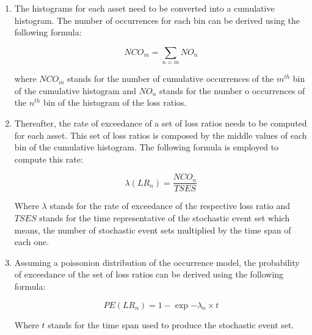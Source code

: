 \begin{enumerate}
\item The histograms for each asset need to be converted into a cumulative histogram. The number of occurrences for each bin can be derived using the following formula:

\begin{equation}
NCO_m = \sum_{n=m} NO_n
\end{equation}

where $NCO_m$ stands for the number of cumulative occurrences of the $m^{th}$ bin of the cumulative histogram and $NO_n$ stands for the number o occurrences of the $n^{th}$ bin of the histogram of the loss ratios.

\item Thereafter, the rate of exceedance of a set of loss ratios needs to be computed for each asset. This set of loss ratios is composed by the middle values of each bin of the cumulative histogram. The following formula is employed to compute this rate:

\begin{equation}
\lambda(LR_n) = \frac{NCO_n}{TSES}
\end{equation}

Where $\lambda$ stands for the rate of exceedance of the respective loss ratio and $TSES$ stands for the time representative of the stochastic event set which means, the number of stochastic event sets multiplied by the time span of each one.

\item Assuming a poissonion distribution of the occurrence model, the probability of exceedance of the set of loss ratios can be derived using the following formula:

\begin{equation}
PE(LR_n) = 1-\exp{-\lambda_n\times t}
\end{equation}

Where $t$ stands for the time span used to produce the stochastic event set.

\end{enumerate}


